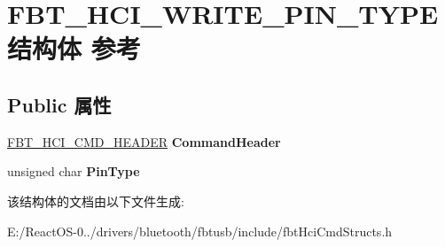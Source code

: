 \hypertarget{struct_f_b_t___h_c_i___w_r_i_t_e___p_i_n___t_y_p_e}{}\section{F\+B\+T\+\_\+\+H\+C\+I\+\_\+\+W\+R\+I\+T\+E\+\_\+\+P\+I\+N\+\_\+\+T\+Y\+P\+E结构体 参考}
\label{struct_f_b_t___h_c_i___w_r_i_t_e___p_i_n___t_y_p_e}
\subsection*{Public 属性}
\begin{DoxyCompactItemize}
\item 
\mbox{\label{struct_f_b_t___h_c_i___w_r_i_t_e___p_i_n___t_y_p_e_aaf426370ac23940f55106852dabe4cff}} 
\hyperlink{struct_f_b_t___h_c_i___c_m_d___h_e_a_d_e_r}{F\+B\+T\+\_\+\+H\+C\+I\+\_\+\+C\+M\+D\+\_\+\+H\+E\+A\+D\+ER} {\bfseries Command\+Header}
\item 
\mbox{\label{struct_f_b_t___h_c_i___w_r_i_t_e___p_i_n___t_y_p_e_a92e4f22907085f762ffcd94640fb5e9f}} 
unsigned char {\bfseries Pin\+Type}
\end{DoxyCompactItemize}


该结构体的文档由以下文件生成\+:\begin{DoxyCompactItemize}
\item 
E\+:/\+React\+O\+S-\/0../drivers/bluetooth/fbtusb/include/fbt\+Hci\+Cmd\+Structs.\+h\end{DoxyCompactItemize}
